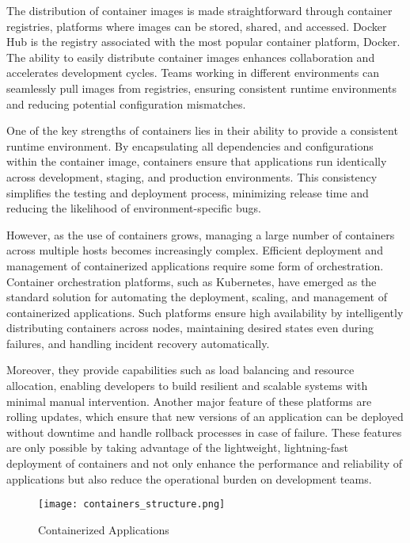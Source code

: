 The distribution of container images is made straightforward through container registries, platforms where images can be stored, shared, and accessed. Docker Hub is the registry associated with the most popular container platform, Docker. The ability to easily distribute container images enhances collaboration and accelerates development cycles. Teams working in different environments can seamlessly pull images from registries, ensuring consistent runtime environments and reducing potential configuration mismatches.

One of the key strengths of containers lies in their ability to provide a consistent runtime environment. By encapsulating all dependencies and configurations within the container image, containers ensure that applications run identically across development, staging, and production environments. This consistency simplifies the testing and deployment process, minimizing release time and reducing the likelihood of environment-specific bugs.

However, as the use of containers grows, managing a large number of containers across multiple hosts becomes increasingly complex. Efficient deployment and management of containerized applications require some form of orchestration. Container orchestration platforms, such as Kubernetes, have emerged as the standard solution for automating the deployment, scaling, and management of containerized applications\cite{dockerDev}. Such platforms ensure high availability by intelligently distributing containers across nodes, maintaining desired states even during failures, and handling incident recovery automatically.

Moreover, they provide capabilities such as load balancing and resource allocation, enabling developers to build resilient and scalable systems with minimal manual intervention. Another major feature of these platforms are rolling updates, which ensure that new versions of an application can be deployed without downtime and handle rollback processes in case of failure. These features are only possible by taking advantage of the lightweight, lightning-fast deployment of containers and not only enhance the performance and reliability of applications but also reduce the operational burden on development teams.

\begin{figure}[!h]
    \graphicspath{ {./diagrams/} }
    \texttt{[image: containers\_structure.png]}
    \centering
    \caption{Containerized Applications}
    \label{fig:containerized_apps}
\end{figure}

